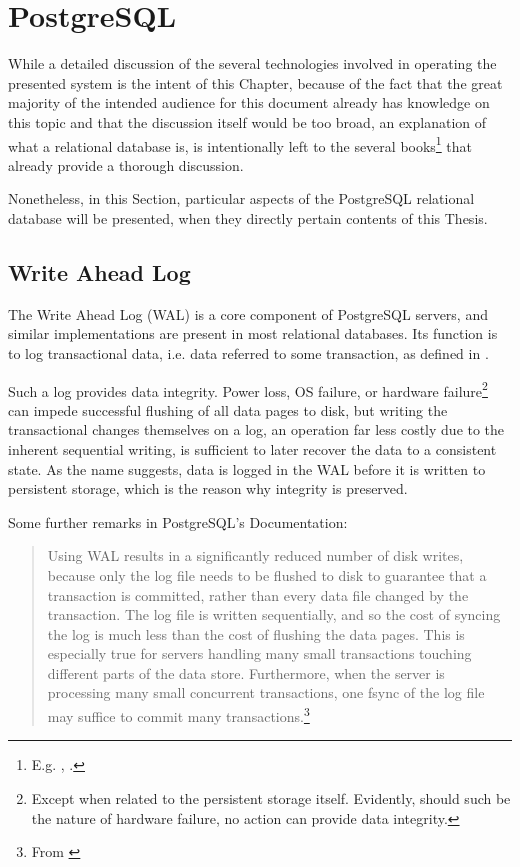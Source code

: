 \section{PostgreSQL}

While a detailed discussion of the several technologies involved in operating the presented system is the intent of this Chapter, because of the fact that the great majority of the intended audience for this document already has knowledge on this topic and that the discussion itself would be too broad, an explanation of what a relational database is, is intentionally left to the several books\footnote{%
	E.g. \cite{dbms}, \cite{db-systems}.
} that already provide a thorough discussion.

Nonetheless, in this Section, particular aspects of the PostgreSQL relational database will be presented, when they directly pertain contents of this Thesis.


\subsection{Write Ahead Log}
\label{sec:wal}

The Write Ahead Log (WAL) is a core component of PostgreSQL servers, and similar implementations are present in most relational databases.
Its function is to log transactional data, i.e. data referred to some transaction, as defined in \cite[\S 16.2]{dbms}.

Such a log provides data integrity.
Power loss, OS failure, or hardware failure\footnote{%
	Except when related to the persistent storage itself.
	Evidently, should such be the nature of hardware failure, no action can provide data integrity.
} can impede successful flushing of all data pages to disk, but writing the transactional changes themselves on a log, an operation far less costly due to the inherent sequential writing, is sufficient to later recover the data to a consistent state.
As the name suggests, data is logged in the WAL before it is written to persistent storage, which is the reason why integrity is preserved.

Some further remarks in PostgreSQL's Documentation:
\begin{quote}
	Using WAL results in a significantly reduced number of disk writes, because only the log file needs to be flushed to disk to guarantee that a transaction is committed, rather than every data file changed by the transaction. The log file is written sequentially, and so the cost of syncing the log is much less than the cost of flushing the data pages. This is especially true for servers handling many small transactions touching different parts of the data store. Furthermore, when the server is processing many small concurrent transactions, one fsync of the log file may suffice to commit many transactions.\footnote{%
		From \cite[\S 29.2]{pg-docs}
	}
\end{quote}

